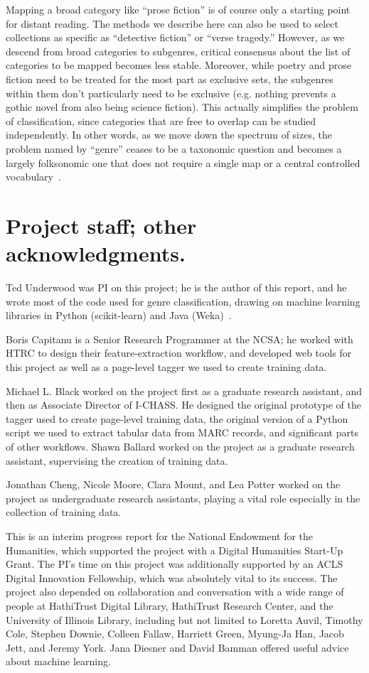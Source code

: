 \documentclass[paper=a4, fontsize=12pt]{scrartcl}
\numberwithin{equation}{section}		%
\numberwithin{figure}{section}			%
\numberwithin{table}{section}				%
\begin{document}
Mapping a broad category like ``prose fiction'' is of course only a starting point for distant reading. The methods we describe here can also be used to select collections as specific as ``detective fiction'' or ``verse tragedy.'' However, as we descend from broad categories to subgenres, critical consensus about the list of categories to be mapped becomes less stable. Moreover, while poetry and prose fiction need to be treated for the most part as exclusive sets, the subgenres within them don't particularly need to be exclusive (e.g. nothing prevents a gothic novel from also being science fiction). This actually simplifies the problem of classification, since categories that are free to overlap can be studied independently. In other words, as we move down the spectrum of sizes, the problem named by ``genre'' ceases to be a taxonomic question and becomes a largely folksonomic one that does not require a single map or a central controlled vocabulary~\cite{vanderwal:folksonomy}.

\section{Project staff; other acknowledgments.}
Ted Underwood was PI on this project; he is the author of this report, and he wrote most of the code used for genre classification, drawing on machine learning libraries in Python (scikit-learn) and Java (Weka)~\cite{scikit-learn, weka}.

Boris Capitanu is a Senior Research Programmer at the NCSA; he worked with HTRC to design their feature-extraction workflow, and developed web tools for this project as well as a page-level tagger we used to create training data.

Michael L. Black worked on the project first as a graduate research assistant, and then as Associate Director of I-CHASS. He designed the original prototype of the tagger used to create page-level training data, the original version of a Python script we used to extract tabular data from MARC records, and significant parts of other workflows. Shawn Ballard worked on the project as a graduate research assistant, supervising the creation of training data.

Jonathan Cheng, Nicole Moore, Clara Mount, and Lea Potter worked on the project as undergraduate research assistants, playing a vital role especially in the collection of training data.

This is an interim progress report for the National Endowment for the Humanities, which supported the project with a Digital Humanities Start-Up Grant. The PI's time on this project was additionally supported by an ACLS Digital Innovation Fellowship, which was absolutely vital to its success. The project also depended on collaboration and conversation with a wide range of people at HathiTrust Digital Library, HathiTrust Research Center, and the University of Illinois Library, including but not limited to Loretta Auvil, Timothy Cole, Stephen Downie, Colleen Fallaw, Harriett Green, Myung-Ja Han, Jacob Jett, and Jeremy York. Jana Diesner and David Bamman offered useful advice about machine learning.
\end{document}
